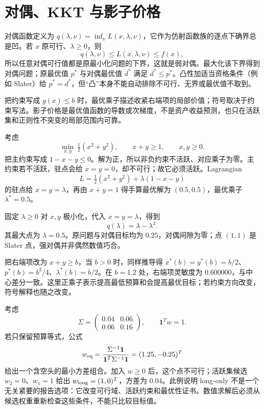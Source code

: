\section{对偶、KKT 与影子价格}

对偶函数定义为 $q(\lambda,\nu)=\inf_xL(x,\lambda,\nu)$，它作为仿射函数族的逐点下确界总是凹。若 $x$ 原可行、$\lambda\ge0$，则
\[
q(\lambda,\nu)\le L(x,\lambda,\nu)\le f(x),
\]
所以任意对偶可行值都是原最小化问题的下界，这就是弱对偶。最大化该下界得到对偶问题；原最优值 $p^*$ 与对偶最优值 $d^*$ 满足 $d^*\le p^*$。凸性加适当资格条件（例如 Slater）给 $p^*=d^*$，但“凸”本身不能自动排除不可行、无界或最优值不取到。

把约束写成 $g(x)\le b$ 时，最优乘子描述收紧右端项的局部价值；符号取决于约束写法。影子价格是最优值函数的导数或次梯度，不是资产收益预测，也只在活跃集和正则性不突变的局部范围内可靠。


考虑
\[
\min_{x,y}\ \tfrac12(x^2+y^2),\qquad x+y\ge1,\qquad x,y\ge0.
\]
把主约束写成 $1-x-y\le0$。解为正，所以非负约束不活跃、对应乘子为零。主约束若不活跃，驻点会给 $x=y=0$，却不可行；故它必须活跃。Lagrangian
\[
L=\tfrac12(x^2+y^2)+\lambda(1-x-y)
\]
的驻点给 $x=y=\lambda$，再由 $x+y=1$ 得手算最优解为 $(0.5,0.5)$，最优乘子 $\lambda^*=0.5$。



固定 $\lambda\ge0$ 对 $x,y$ 极小化，代入 $x=y=\lambda$，得到
\[
q(\lambda)=\lambda-\lambda^2.
\]
其最大点为 $\lambda=0.5$。原问题与对偶目标均为 $0.25$，对偶间隙为零；点 $(1,1)$ 是 Slater 点，强对偶并非偶然数值巧合。

把右端项改为 $x+y\ge b$，当 $b>0$ 时，同样推导得 $x^*(b)=y^*(b)=b/2$、$p^*(b)=b^2/4$、$\lambda^*(b)=b/2$。在 $b=1.2$ 处，右端项灵敏度为 $0.600000$，与中心差分一致。这里正乘子表示提高最低预算和会提高最优目标；若约束方向改变，符号解释也随之改变。


考虑
\[
 \Sigma=\begin{pmatrix}0.04&0.06\\0.06&0.16\end{pmatrix},
 \qquad \mathbf1^Tw=1.
\]
若只保留预算等式，公式
\[
 w_{\rm eq}=\frac{\Sigma^{-1}\mathbf1}{\mathbf1^T\Sigma^{-1}\mathbf1}
 =(1.25,-0.25)^T
\]
给出一个含空头的最小方差组合。加入 $w\ge0$ 后，这个点不可行；活跃集候选 $w_2=0$、$w_1=1$ 给出 $w_{\rm long}=(1,0)^T$，方差为 $0.04$。此例说明 long-only 不是一个无关紧要的报告选项：它改变可行域、活跃约束和最优性证书。数值求解后必须从候选权重重新检查这些条件，不能只比较目标值。

